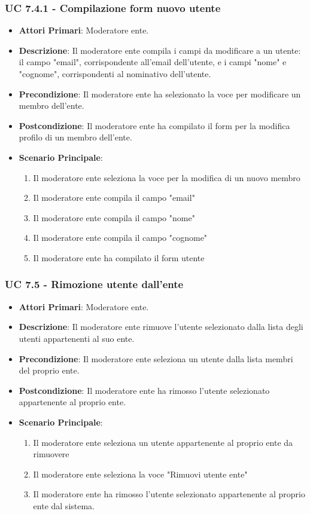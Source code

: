 			\subsubsection{UC 7.4.1 - Compilazione form nuovo utente}
			\begin{itemize}
				\item \textbf{Attori Primari}: Moderatore ente.
				\item \textbf{Descrizione}: Il moderatore ente compila i campi da modificare a un utente: il campo "email", corrispondente all'email dell'utente, e i campi "nome" e "cognome", corrispondenti al nominativo dell'utente.
				\item \textbf{Precondizione}: Il moderatore ente ha selezionato la voce per modificare un membro dell'ente.
				\item \textbf{Postcondizione}: Il moderatore ente ha compilato il form per la modifica profilo di un membro dell'ente.
				\item \textbf{Scenario Principale}:
				\begin{enumerate}
					\item{Il moderatore ente seleziona la voce per la modifica di un nuovo membro}
					\item{Il moderatore ente compila il campo "email"}
					\item{Il moderatore ente compila il campo "nome"}
					\item{Il moderatore ente compila il campo "cognome"}
					\item{Il moderatore ente ha compilato il form utente}
				\end{enumerate}	
			\end{itemize}
			
			\subsubsection{UC 7.5 - Rimozione utente dall'ente}
			\begin{itemize}
				\item \textbf{Attori Primari}: Moderatore ente.
				\item \textbf{Descrizione}: Il moderatore ente rimuove l'utente selezionato dalla lista degli utenti appartenenti al suo ente.
				\item \textbf{Precondizione}: Il moderatore ente seleziona un utente dalla lista membri del proprio ente.
				\item \textbf{Postcondizione}: Il moderatore ente ha rimosso l'utente selezionato appartenente al proprio ente.
				\item \textbf{Scenario Principale}:
				\begin{enumerate}
					\item{Il moderatore ente seleziona un utente appartenente al proprio ente da rimuovere}
					\item{Il moderatore ente seleziona la voce "Rimuovi utente ente"}
					\item{Il moderatore ente ha rimosso l'utente selezionato appartenente al proprio ente dal sistema.}
				\end{enumerate}		
			\end{itemize}

